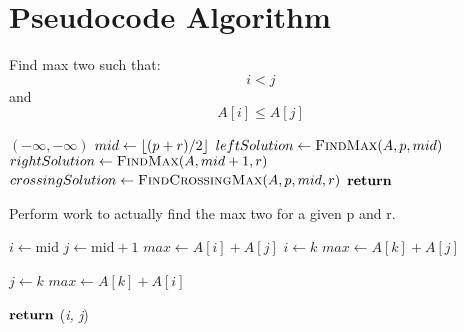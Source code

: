 \documentclass{article}
\DeclarePairedDelimiter\floor{\lfloor}{\rfloor}
\begin{document}
 

    \section{Pseudocode Algorithm}

    \begin{algorithm}[H]             
        \caption{Find max two such that: \[i < j\] and \[A[i] \leq A[j]\]}
        \label{alg:algorithm-label}
        \begin{algorithmic}[1]
                    \Return $ (-\infty, -\infty) $ 
                \Else
                    \State $ mid \gets \floor{(p + r)/2} $
                    \State $ leftSolution \gets \Call{FindMax}{A, p, mid} $
                    \State $ rightSolution \gets \Call{FindMax}{A, mid + 1, r} $
                    \State $ crossingSolution \gets \Call{FindCrossingMax}{A, p, mid, r} $
                    \State $ \Return $  $ $
                \EndIf
            \EndFunction
        \end{algorithmic}        
    \end{algorithm}    

    \begin{algorithm}[H]               
        \caption{Perform work to actually find the max two for a given p and r.}
        \label{alg:algorithm-label}
        \begin{algorithmic}[1]
                \State $ i \gets \text{mid} $
                \State $ j \gets \text{mid} + 1 $            
                \State $ max \gets  A[i] + A[j]$    
                        \State $ i \gets k $
                        \State $ max \gets A[k] + A[j] $
                    \EndIf
                \EndFor

                        \State $ j \gets k $
                        \State $ max \gets A[k] + A[i] $
                    \EndIf
                \EndFor

                \State $ \Return $ (\textit{i, j})
            \EndFunction
        \end{algorithmic}        
    \end{algorithm}    
        
\end{document}
